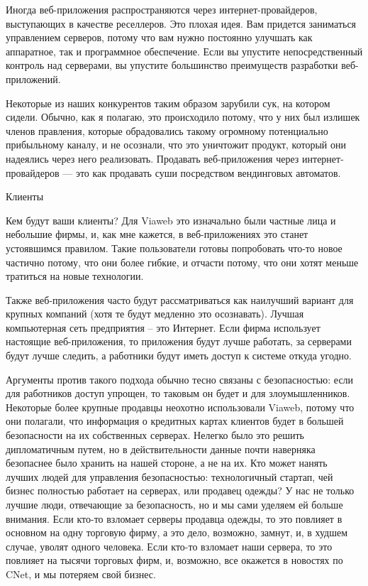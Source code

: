 \documentclass[ebook,12pt,oneside,openany]{memoir}
\begin{document}
Иногда веб-приложения распространяются через интернет-провайдеров,
выступающих в качестве реселлеров. Это плохая идея. Вам придется
заниматься управлением серверов, потому что вам нужно постоянно
улучшать как аппаратное, так и программное обеспечение. Если вы
упустите непосредственный контроль над серверами, вы упустите
большинство преимуществ разработки веб-приложений.

Некоторые из наших конкурентов таким образом зарубили сук, на котором
сидели. Обычно, как я полагаю, это происходило потому, что у них был
излишек членов правления, которые обрадовались такому огромному
потенциально прибыльному каналу, и не осознали, что это уничтожит
продукт, который они надеялись через него реализовать. Продавать
веб-приложения через интернет-провайдеров — это как продавать суши
посредством вендинговых автоматов.

Клиенты

Кем будут ваши клиенты? Для Viaweb это изначально были частные лица и
небольшие фирмы, и, как мне кажется, в веб-приложениях это станет
устоявшимся правилом. Такие пользователи готовы попробовать что-то
новое частично потому, что они более гибкие, и отчасти потому, что они
хотят меньше тратиться на новые технологии.

Также веб-приложения часто будут рассматриваться как наилучший вариант
для крупных компаний (хотя те будут медленно это осознавать). Лучшая
компьютерная сеть предприятия – это Интернет. Если фирма использует
настоящие веб-приложения, то приложения будут лучше работать, за
серверами будут лучше следить, а работники будут иметь доступ к
системе откуда угодно.

Аргументы против такого подхода обычно тесно связаны с безопасностью:
если для работников доступ упрощен, то таковым он будет и для
злоумышленников. Некоторые более крупные продавцы неохотно
использовали Viaweb, потому что они полагали, что информация о
кредитных картах клиентов будет в большей безопасности на их
собственных серверах. Нелегко было это решить дипломатичным путем, но
в действительности данные почти наверняка безопаснее было хранить на
нашей стороне, а не на их. Кто может нанять лучших людей для
управления безопасностью: технологичный стартап, чей бизнес полностью
работает на серверах, или продавец одежды? У нас не только лучшие
люди, отвечающие за безопасность, но и мы сами уделяем ей больше
внимания. Если кто-то взломает серверы продавца одежды, то это
повлияет в основном на одну торговую фирму, а это дело, возможно,
замнут, и, в худшем случае, уволят одного человека. Если кто-то
взломает наши сервера, то это повлияет на тысячи торговых фирм, и,
возможно, все окажется в новостях по CNet, и мы потеряем свой бизнес.
\end{document}
